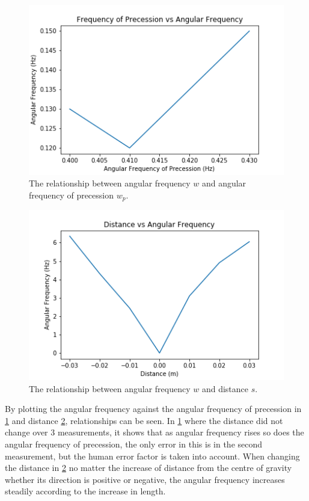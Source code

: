 \documentclass[12pt]{article}
\begin{document}
\begin{multicols}{2}
\begin{figure}[H]
\centering
\includegraphics[scale=0.6]{Images/StillAngularFrequencyvsFrequencyofPrecession.png}
\caption{The relationship between angular frequency $w$ and angular frequency of precession $w_p$.}
\label{Still precesison}
\end{figure}

\begin{figure}[H]
\centering
\includegraphics[scale=0.6]{Images/ChangeAngularFrequencyvsFrequencyofPrecession.png}
\caption{The relationship between angular frequency $w$ and distance $s$.}
\label{change precession}
\end{figure}
\end{multicols}

By plotting the angular frequency against the angular frequency of precession in \cref{Still precesison} and distance \cref{change precession}, relationships can be seen. In \cref{Still precesison} where the distance did not change over 3 measurements, it shows that as angular frequency rises so does the angular frequency of precession, the only error in this is in the second measurement, but the human error factor is taken into account. When changing the distance in \cref{change precession} no matter the increase of distance from the centre of gravity whether its direction is positive or negative, the angular frequency increases steadily according to the increase in length. \\
\end{document}
